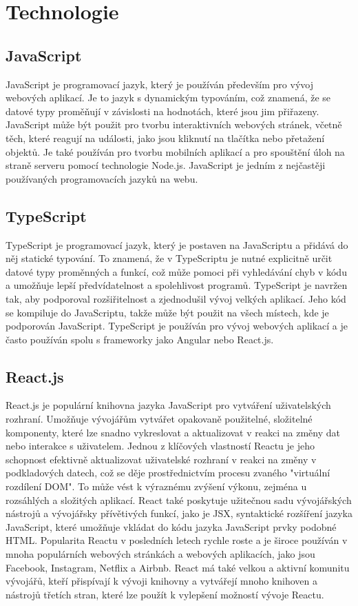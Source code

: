 \section{Technologie}

\subsection{JavaScript}

JavaScript je programovací jazyk, který je používán především pro vývoj webových aplikací. Je to jazyk s dynamickým typováním, což znamená, že se datové typy proměňují v závislosti na hodnotách, které jsou jim přiřazeny. JavaScript může být použit pro tvorbu interaktivních webových stránek, včetně těch, které reagují na události, jako jsou kliknutí na tlačítka nebo přetažení objektů. Je také používán pro tvorbu mobilních aplikací a pro spouštění úloh na straně serveru pomocí technologie Node.js. JavaScript je jedním z nejčastěji používaných programovacích jazyků na webu.

\subsection{TypeScript}
TypeScript je programovací jazyk, který je postaven na JavaScriptu a přidává do něj statické typování. To znamená, že v TypeScriptu je nutné explicitně určit datové typy proměnných a funkcí, což může pomoci při vyhledávání chyb v kódu a umožňuje lepší předvídatelnost a spolehlivost programů. TypeScript je navržen tak, aby podporoval rozšiřitelnost a zjednodušil vývoj velkých aplikací. Jeho kód se kompiluje do JavaScriptu, takže může být použit na všech místech, kde je podporován JavaScript. TypeScript je používán pro vývoj webových aplikací a je často používán spolu s frameworky jako Angular nebo React.js.
\subsection{React.js}
React.js je populární knihovna jazyka JavaScript pro vytváření uživatelských rozhraní. Umožňuje vývojářům vytvářet opakovaně použitelné, složitelné komponenty, které lze snadno vykreslovat a aktualizovat v reakci na změny dat nebo interakce s uživatelem. Jednou z klíčových vlastností Reactu je jeho schopnost efektivně aktualizovat uživatelské rozhraní v reakci na změny v podkladových datech, což se děje prostřednictvím procesu zvaného "virtuální rozdílení DOM". To může vést k výraznému zvýšení výkonu, zejména u rozsáhlých a složitých aplikací. React také poskytuje užitečnou sadu vývojářských nástrojů a vývojářsky přívětivých funkcí, jako je JSX, syntaktické rozšíření jazyka JavaScript, které umožňuje vkládat do kódu jazyka JavaScript prvky podobné HTML. Popularita Reactu v posledních letech rychle roste a je široce používán v mnoha populárních webových stránkách a webových aplikacích, jako jsou Facebook, Instagram, Netflix a Airbnb. React má také velkou a aktivní komunitu vývojářů, kteří přispívají k vývoji knihovny a vytvářejí mnoho knihoven a nástrojů třetích stran, které lze použít k vylepšení možností vývoje Reactu.
